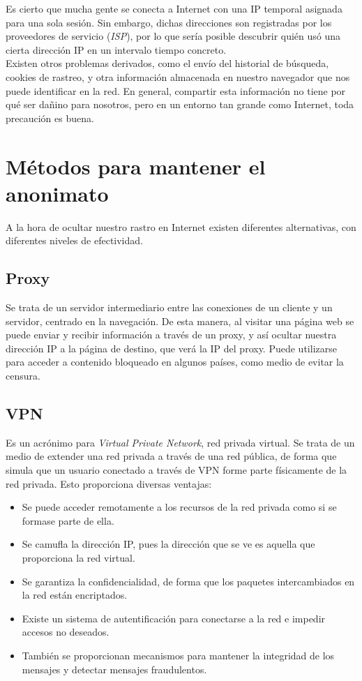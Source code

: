 	
	Es cierto que mucha gente se conecta a Internet con una IP temporal asignada para una sola sesión. Sin embargo, dichas direcciones son registradas por los proveedores de servicio (\textit{ISP}), por lo que sería posible descubrir quién usó una cierta dirección IP en un intervalo tiempo concreto.\\
	
	Existen otros problemas derivados, como el envío del historial de búsqueda, cookies de rastreo, y otra información almacenada en nuestro navegador que nos puede identificar en la red. En general, compartir esta información no tiene por qué ser dañino para nosotros, pero en un entorno tan grande como Internet, toda precaución es buena. 
	
	
	
	
	\section{Métodos para mantener el anonimato}
	
	A la hora de ocultar nuestro rastro en Internet existen diferentes alternativas, con diferentes niveles de efectividad.
	
\subsection{Proxy} Se trata de un servidor intermediario entre las conexiones de un cliente y un servidor, centrado en la navegación. De esta manera, al visitar una página web se puede enviar y recibir información a través de un proxy, y así ocultar nuestra dirección IP a la página de destino, que verá la IP del proxy. Puede utilizarse para acceder a contenido bloqueado en algunos países, como medio de evitar la censura.

\subsection{VPN} Es un acrónimo para \textit{Virtual Private Network}, red privada virtual. Se trata de un medio de extender una red privada a través de una red pública, de forma que simula que un usuario conectado a través de VPN forme parte físicamente de la red privada. Esto proporciona diversas ventajas:

\begin{itemize}
	\item Se puede acceder remotamente a los recursos de la red privada como si se formase parte de ella.
	\item Se camufla la dirección IP, pues la dirección que se ve es aquella que proporciona la red virtual.
	\item Se garantiza la confidencialidad, de forma que los paquetes intercambiados en la red están encriptados.
	\item Existe un sistema de autentificación para conectarse a la red e impedir accesos no deseados.
	\item También se proporcionan mecanismos para mantener la integridad de los mensajes y detectar mensajes fraudulentos.
\end{itemize}
	
